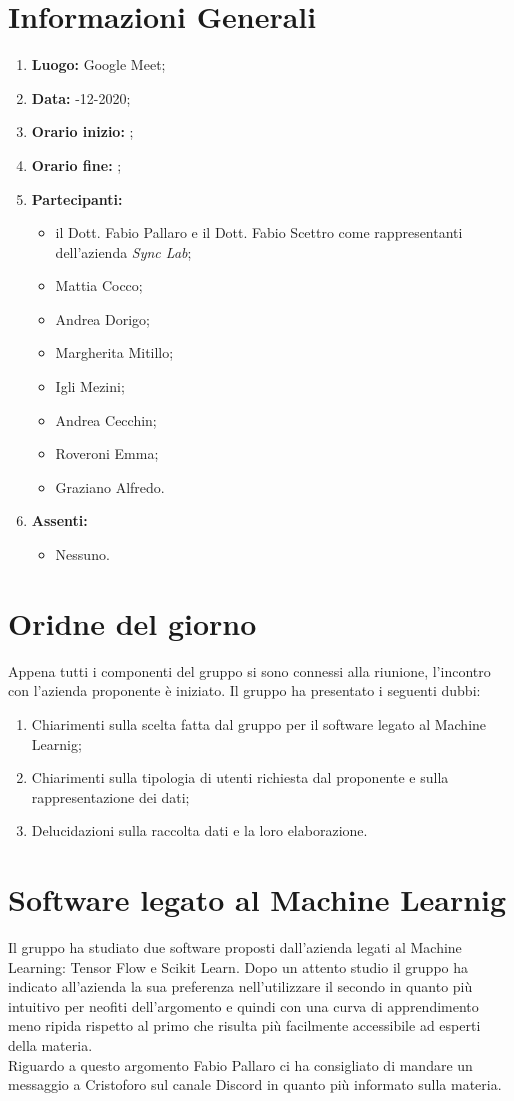 \newpage
\section{Informazioni Generali}
\begin{enumerate}
	\item \textbf{Luogo:} \normalfont Google Meet;
	\item \textbf{Data:} -12-2020;
	\item \textbf{Orario inizio:} ;
	\item \textbf{Orario fine:} ;
	\item \textbf{Partecipanti:}
	\begin{itemize}
		\item il Dott. Fabio Pallaro e il Dott. Fabio Scettro come rappresentanti dell'azienda \textit{Sync Lab};
		\item Mattia Cocco; 
		\item Andrea Dorigo;
		\item Margherita Mitillo;
		\item Igli Mezini;
		\item Andrea Cecchin;
		\item Roveroni Emma;
		\item Graziano Alfredo.
	\end{itemize}
	\item \textbf{Assenti:}
	\begin{itemize}
		\item Nessuno.
	\end{itemize}
\end{enumerate}
\section{Oridne del giorno}
Appena tutti i componenti del gruppo si sono connessi alla riunione, l'incontro con l'azienda proponente è iniziato. Il gruppo ha presentato i seguenti dubbi:
\begin{enumerate}
	\item Chiarimenti sulla scelta fatta dal gruppo per il software legato al Machine Learnig;
	\item Chiarimenti sulla tipologia di utenti richiesta dal proponente e sulla rappresentazione dei dati;
	\item Delucidazioni sulla raccolta dati e la loro elaborazione.
\end{enumerate}
\section{Software legato al Machine Learnig}
Il gruppo ha studiato due software proposti dall'azienda legati al Machine Learning: Tensor Flow e Scikit Learn.
Dopo un attento studio il gruppo ha indicato all'azienda la sua preferenza nell'utilizzare il secondo in quanto più intuitivo per neofiti dell'argomento e quindi con una curva di apprendimento meno ripida rispetto al primo che risulta più facilmente accessibile ad esperti della materia. \\
Riguardo a questo argomento Fabio Pallaro ci ha consigliato di mandare un messaggio a Cristoforo sul canale Discord in quanto più informato sulla materia.

